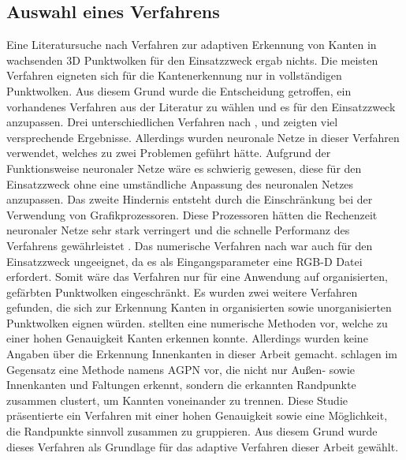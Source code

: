 \subsection{Auswahl eines Verfahrens}
Eine Literatursuche nach Verfahren zur adaptiven Erkennung von Kanten in wachsenden 3D Punktwolken für den Einsatzzweck ergab nichts. Die meisten Verfahren eigneten sich für die Kantenerkennung nur in vollständigen Punktwolken. Aus diesem Grund wurde die Entscheidung getroffen, ein vorhandenes Verfahren aus der Literatur zu wählen und es für den Einsatzzweck anzupassen. Drei unterschiedlichen Verfahren nach \textcite{bazazian_edc-net_2021}, \textcite{himeur_pcednet_2021} und \textcite{rachmadi_road_2017} zeigten viel versprechende Ergebnisse. Allerdings wurden neuronale Netze in dieser Verfahren verwendet, welches zu zwei Problemen geführt hätte. Aufgrund der Funktionsweise neuronaler Netze wäre es schwierig gewesen, diese für den Einsatzzweck ohne eine umständliche Anpassung des neuronalen Netzes anzupassen. Das zweite Hindernis entsteht durch die Einschränkung bei der Verwendung von Grafikprozessoren. Diese Prozessoren hätten die Rechenzeit neuronaler Netze sehr stark verringert und die schnelle Performanz des Verfahrens gewährleistet \autocite[625]{luo_artificial_2005}. Das numerische Verfahren nach \textcite{choi_rgb-d_2013} war auch für den Einsatzzweck ungeeignet, da es als Eingangsparameter eine RGB-D Datei erfordert. Somit wäre das Verfahren nur für eine Anwendung auf organisierten, gefärbten Punktwolken eingeschränkt. Es wurden zwei weitere Verfahren gefunden, die sich zur Erkennung Kanten in organisierten sowie unorganisierten Punktwolken eignen würden. \textcite{mineo_novel_2019} stellten eine numerische Methoden vor, welche zu einer hohen Genauigkeit Kanten erkennen konnte. Allerdings wurden keine Angaben über die Erkennung Innenkanten in dieser Arbeit gemacht. \textcite{ni_edge_2016} schlagen im Gegensatz eine Methode namens AGPN vor, die nicht nur Außen- sowie Innenkanten und Faltungen erkennt, sondern die erkannten Randpunkte zusammen clustert, um Kannten voneinander zu trennen. Diese Studie präsentierte ein Verfahren mit einer hohen Genauigkeit sowie eine Möglichkeit, die Randpunkte sinnvoll zusammen zu gruppieren. Aus diesem Grund wurde dieses Verfahren als Grundlage für das adaptive Verfahren dieser Arbeit gewählt.

